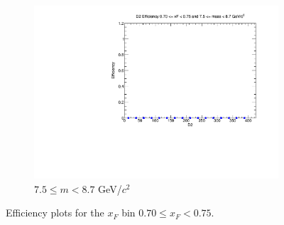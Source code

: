 \documentclass[11pt]{article}
\begin{document}
\begin{figure}[p]
\begin{subfigure}[b]{0.32\textwidth}
        \includegraphics[width=\textwidth]{./kTrackerEfficiencyPlots/D2_Efficiency_xF14_mass10.pdf}
        \caption{$7.5 \leq m < 8.7$ GeV/$c^2$}
    \end{subfigure}
    \caption{Efficiency plots for the $x_F$ bin $0.70 \leq x_F < 0.75$.}
\end{figure}
\end{document}
